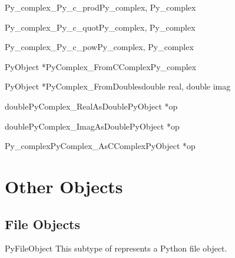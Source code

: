 \documentclass[twoside,openright]{report}
\begin{document}
\begin{cfuncdesc}{Py_complex}{_Py_c_prod}{Py_complex, Py_complex}

\end{cfuncdesc}

\begin{cfuncdesc}{Py_complex}{_Py_c_quot}{Py_complex, Py_complex}

\end{cfuncdesc}

\begin{cfuncdesc}{Py_complex}{_Py_c_pow}{Py_complex, Py_complex}

\end{cfuncdesc}

\begin{cfuncdesc}{PyObject *}{PyComplex_FromCComplex}{Py_complex}

\end{cfuncdesc}

\begin{cfuncdesc}{PyObject *}{PyComplex_FromDoubles}{double real, double imag}

\end{cfuncdesc}

\begin{cfuncdesc}{double}{PyComplex_RealAsDouble}{PyObject *op}

\end{cfuncdesc}

\begin{cfuncdesc}{double}{PyComplex_ImagAsDouble}{PyObject *op}

\end{cfuncdesc}

\begin{cfuncdesc}{Py_complex}{PyComplex_AsCComplex}{PyObject *op}

\end{cfuncdesc}



\section{Other Objects}

\subsection{File Objects}

\begin{ctypedesc}{PyFileObject}
This subtype of  represents a Python file object.
\end{ctypedesc}
\end{document}
